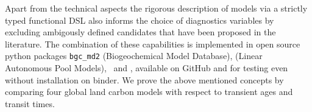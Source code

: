 Apart from the technical aspects the rigorous description of models via a
strictly typed functional DSL also informs the choice of diagnostics variables by
excluding ambigously defined candidates that have been proposed in the literature. 
The combination of these capabilities is implemented in open source python
packages \texttt{bgc\_md2} (Biogeochemical Model Database), 
\LAPM (Linear Autonomous Pool Models),
\CompartmentalSystems\ and \ComputabilityGraphs, available on GitHub and for testing even without installation on binder. 
We prove the above mentioned concepts by comparing four global land carbon models with respect to transient ages and transit times.
